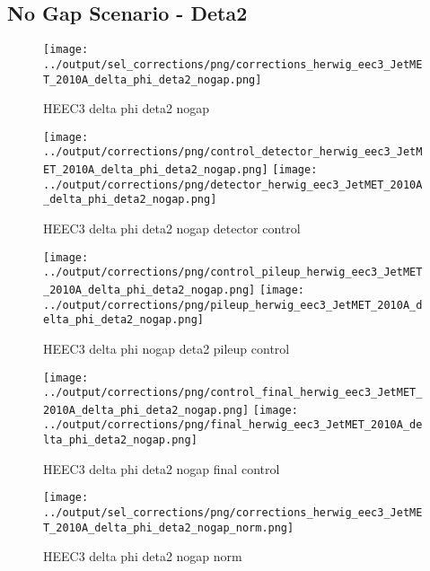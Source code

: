\documentclass[11pt]{book}
\begin{document}
\clearpage
\subsection{No Gap Scenario - Deta2}
\begin{figure}[ht]
\centering
\texttt{[image: ../output/sel\_corrections/png/corrections\_herwig\_eec3\_JetMET\_2010A\_delta\_phi\_deta2\_nogap.png]}
\caption{HEEC3 delta phi deta2 nogap}
\label{fig:HEEC3_JetMET_2010A_delta_phi_deta2_nogap}
\end{figure}

\begin{figure}[ht]
\centering
\texttt{[image: ../output/corrections/png/control\_detector\_herwig\_eec3\_JetMET\_2010A\_delta\_phi\_deta2\_nogap.png]}
\texttt{[image: ../output/corrections/png/detector\_herwig\_eec3\_JetMET\_2010A\_delta\_phi\_deta2\_nogap.png]}
\caption{HEEC3 delta phi deta2 nogap detector control}
\label{fig:HEEC3_JetMET_2010A_delta_phi_deta2_nogap_detector_control}
\end{figure}

\begin{figure}[ht]
\centering
\texttt{[image: ../output/corrections/png/control\_pileup\_herwig\_eec3\_JetMET\_2010A\_delta\_phi\_deta2\_nogap.png]}
\texttt{[image: ../output/corrections/png/pileup\_herwig\_eec3\_JetMET\_2010A\_delta\_phi\_deta2\_nogap.png]}
\caption{HEEC3 delta phi nogap deta2 pileup control}
\label{fig:HEEC3_JetMET_2010A_delta_phi_deta2_nogap_pileup_control}
\end{figure}


\begin{figure}[ht]
\centering
\texttt{[image: ../output/corrections/png/control\_final\_herwig\_eec3\_JetMET\_2010A\_delta\_phi\_deta2\_nogap.png]}
\texttt{[image: ../output/corrections/png/final\_herwig\_eec3\_JetMET\_2010A\_delta\_phi\_deta2\_nogap.png]}
\caption{HEEC3 delta phi deta2 nogap final control}
\label{fig:HEEC3_JetMET_2010A_delta_phi_deta2_nogap_final_control}
\end{figure}

\begin{figure}[ht]
\centering
\texttt{[image: ../output/sel\_corrections/png/corrections\_herwig\_eec3\_JetMET\_2010A\_delta\_phi\_deta2\_nogap\_norm.png]}
\caption{HEEC3 delta phi deta2 nogap norm}
\label{fig:HEEC3_JetMET_2010A_delta_phi_deta2_nogap_norm}
\end{figure}
\end{document}
